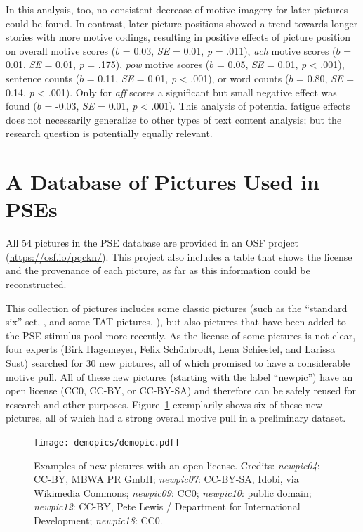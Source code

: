 \documentclass[jou,a4paper]{apa6}\usepackage[]{graphicx}\usepackage[]{color}
\begin{document}
In this analysis, too, no consistent decrease of motive imagery for later pictures could be found. In contrast, later picture positions showed a trend towards longer stories with more motive codings, resulting in positive effects of picture position on overall motive scores ($b$ = 0.03, \emph{SE} = 0.01, \emph{p} = .011), \emph{ach} motive scores ($b$ = 0.01, \emph{SE} = 0.01, \emph{p} = .175), \emph{pow} motive scores ($b$ = 0.05, \emph{SE} = 0.01, \emph{p} < .001), sentence counts ($b$ = 0.11, \emph{SE} = 0.01, \emph{p} < .001), or word counts ($b$ = 0.80, \emph{SE} = 0.14, \emph{p} < .001). Only for \emph{aff} scores a significant but small negative effect was found ($b$ = -0.03, \emph{SE} = 0.01, \emph{p} < .001). This analysis of potential fatigue effects does not necessarily generalize to other types of text content analysis; but the research question is potentially equally relevant.

\section{A Database of Pictures Used in PSEs}

All 54 pictures in the PSE database are provided in an OSF project (\url{https://osf.io/pqckn/}). This project also includes a table that shows the license and the provenance of each picture, as far as this information could be reconstructed. 

This collection of pictures includes some classic pictures (such as the ``standard six'' set, , and some TAT pictures, ), but also pictures that have been added to the PSE stimulus pool more recently. As the license of some pictures is not clear, four experts (Birk Hagemeyer, Felix Schönbrodt, Lena Schiestel, and Larissa Sust) searched for 30 new pictures, all of which promised to have a considerable motive pull. All of these new pictures (starting with the label ``newpic'') have an open license (CC0, CC-BY, or CC-BY-SA) and therefore can be safely reused for research and other purposes. Figure~\ref{fig:demopic} exemplarily shows six of these new pictures, all of which had a strong overall motive pull in a preliminary dataset.


\begin{figure}[htp]
  \begin{center}
	\texttt{[image: demopics/demopic.pdf]}
  \end{center}
  \caption{Examples of new pictures with an open license. Credits: \emph{newpic04}: CC-BY, MBWA PR GmbH; \emph{newpic07}: CC-BY-SA, Idobi, via Wikimedia Commons; \emph{newpic09}: CC0; \emph{newpic10}: public domain; \emph{newpic12}: CC-BY, Pete Lewis / Department for International Development; \emph{newpic18}: CC0.}
  \label{fig:demopic}
\end{figure}
\end{document}
